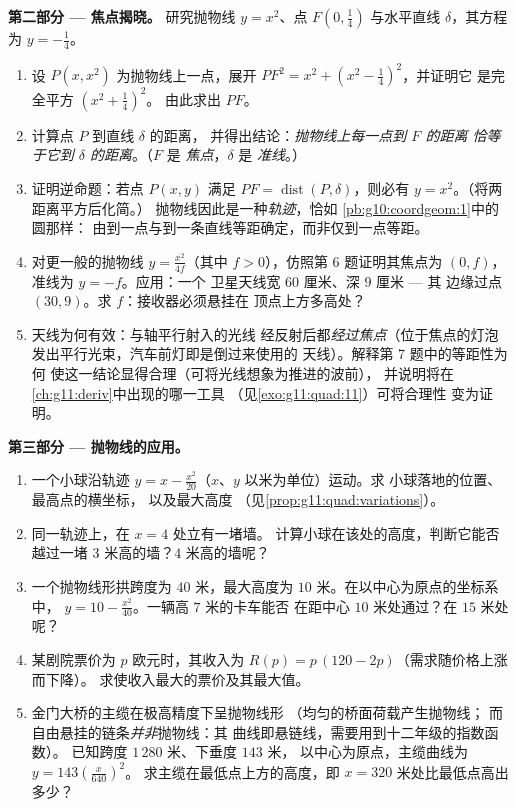 \begin{problem}
\medskip
\noindent\textbf{第二部分 --- 焦点揭晓。}
研究抛物线 $y = x^2$、点
$F\left(0, \frac14\right)$ 与水平直线 $\delta$，其方程为
$y = -\frac14$。
\begin{enumerate}[resume]
  \item 设 $P(x, x^2)$ 为抛物线上一点，展开
        $PF^2 = x^2 + \left(x^2 - \frac14\right)^2$，并证明它
        是完全平方 $\left(x^2 + \frac14\right)^2$。
        由此求出 $PF$。
  \item 计算点 $P$ 到直线 $\delta$ 的距离，
        并得出结论：\emph{抛物线上每一点到 $F$ 的距离
        恰等于它到 $\delta$ 的距离}。（$F$ 是
        \emph{焦点}，$\delta$ 是
        \emph{准线}。）
  \item 证明逆命题：若点 $P(x, y)$ 满足
        $PF = \operatorname{dist}(P, \delta)$，则必有
        $y = x^2$。（将两距离平方后化简。）
        抛物线因此是一种\emph{轨迹}，恰如
        \cref{pb:g10:coordgeom:1}中的圆那样：
        由到一点与到一条直线等距确定，而非仅到一点等距。
  \item 对更一般的抛物线 $y = \frac{x^2}{4f}$（其中
        $f > 0$），仿照第 6 题证明其焦点为
        $(0, f)$，准线为 $y = -f$。应用：一个
        卫星天线宽 $60$ 厘米、深 $9$ 厘米 --- 其
        边缘过点 $(30, 9)$。求 $f$：接收器必须悬挂在
        顶点上方多高处？
  \item 天线为何有效：与轴平行射入的光线
        经反射后都\emph{经过焦点}（位于焦点的灯泡
        发出平行光束，汽车前灯即是倒过来使用的
        天线）。解释第 7 题中的等距性为何
        使这一结论显得合理（可将光线想象为推进的波前），
        并说明将在\cref{ch:g11:deriv}中出现的哪一工具
        （见\cref{exo:g11:quad:11}）可将合理性
        变为证明。
\end{enumerate}

\medskip
\noindent\textbf{第三部分 --- 抛物线的应用。}
\begin{enumerate}[resume]
  \item 一个小球沿轨迹
        $y = x - \frac{x^2}{20}$（$x$、$y$ 以米为单位）运动。求
        小球落地的位置、最高点的横坐标，
        以及最大高度
        （见\cref{prop:g11:quad:variations}）。
  \item 同一轨迹上，在 $x = 4$ 处立有一堵墙。
        计算小球在该处的高度，判断它能否越过一堵
        $3$ 米高的墙？$4$ 米高的墙呢？
  \item 一个抛物线形拱跨度为 $40$ 米，最大高度为
        $10$ 米。在以中心为原点的坐标系中，
        $y = 10 - \frac{x^2}{40}$。一辆高 $7$ 米的卡车能否
        在距中心 $10$ 米处通过？在 $15$ 米处呢？
  \item 某剧院票价为 $p$ 欧元时，其收入为
        $R(p) = p\,(120 - 2p)$（需求随价格上涨而下降）。
        求使收入最大的票价及其最大值。
  \item 金门大桥的主缆在极高精度下呈抛物线形
        （均匀的桥面荷载产生抛物线；
        而自由悬挂的链条\emph{并非}抛物线：其
        曲线即悬链线，需要用到十二年级的指数函数）。
        已知跨度 $1\,280$ 米、下垂度 $143$ 米，
        以中心为原点，主缆曲线为 $y = 143\left(\frac{x}{640}\right)^2$。
        求主缆在最低点上方的高度，即
        $x = 320$ 米处比最低点高出多少？
\end{enumerate}


\end{problem}
